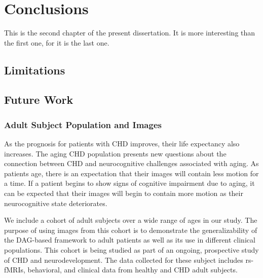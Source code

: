 \chapter{Conclusions}
This is the second chapter of the present dissertation. It is more interesting than the first one, for it is the last one.

\section{Limitations}

\section{Future Work}

\subsection{Adult Subject Population and Images}

As the prognosis for patients with CHD improves, their life expectancy also increases. The aging CHD population presents new questions about the connection between CHD and neurocognitive challenges associated with aging. As patients age, there is an expectation that their images will contain less motion for a time. If a patient begins to show signs of cognitive impairment due to aging, it can be expected that their images will begin to contain more motion as their neurocognitive state deteriorates. 

We include a cohort of adult subjects over a wide range of ages in our study. The purpose of using images from this cohort is to demonstrate the generalizability of the DAG-based framework to adult patients as well as its use in different clinical populations. This cohort is being studied as part of an ongoing, prospective study of CHD and neurodevelopment. The data collected for these subject includes rs-fMRIs, behavioral, and clinical data from healthy and CHD adult subjects. 
